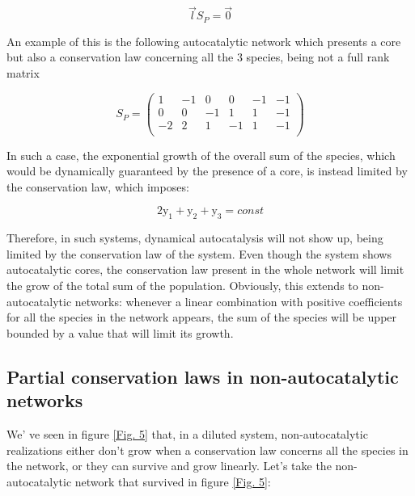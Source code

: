 \documentclass{article}
\begin{document}
\begin{center}
\begin{equation}
    \Vec{l}S_P = \Vec{0}
\end{equation}
\end{center}

An example of this is the following autocatalytic network which presents a core but also a conservation law concerning all the $3$ species, being not a full rank matrix

\begin{center}
    \begin{equation}
        S_P=\begin{pmatrix}
            1 & -1 & 0 & 0 & -1 & -1 \\
            0 & 0 & -1 & 1 & 1 & -1 \\
            -2 & 2 & 1 & -1 & 1 & -1 \\
        \end{pmatrix}
    \end{equation}
\end{center}

In such a case, the exponential growth of the overall sum of the species, which would be dynamically guaranteed by the presence of a core, is instead limited by the conservation law, which imposes:

\begin{center}
    \begin{equation}
        2\textrm{y}_1+\textrm{y}_2+\textrm{y}_3=const
    \end{equation}
\end{center}

Therefore, in such systems, dynamical autocatalysis will not show up, being limited by the conservation law of the system. Even though the system shows autocatalytic cores, the conservation law present in the whole network will limit the grow of the total sum of the population.
Obviously, this extends to non-autocatalytic networks: whenever a linear combination with positive coefficients for all the species in the network appears, the sum of the species will be upper bounded by a value that will limit its growth. 

\subsection{Partial conservation laws in non-autocatalytic networks}
We' ve seen in figure \ref{Fig. 5} that, in a diluted system, non-autocatalytic realizations either don't grow when a conservation law concerns all the species in the network, or they can survive and grow linearly. Let's take the non-autocatalytic network that survived in figure \ref{Fig. 5}:
\end{document}
